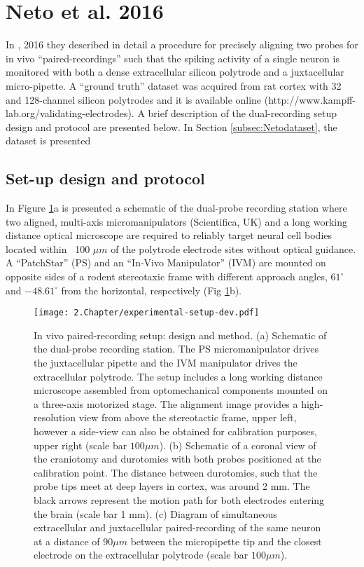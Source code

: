 
\section{Neto et al. 2016}
\label{sec:exp-setup}
In \cite{Netoetal}, 2016 they described in detail a procedure for precisely aligning two probes for in vivo “paired-recordings” such that the spiking activity of a single neuron is monitored with both a dense extracellular silicon polytrode and a juxtacellular micro-pipette. A “ground truth” dataset was acquired from rat cortex with 32 and 128-channel silicon polytrodes and it is available online (http://www.kampff-lab.org/validating-electrodes). A brief description of the dual-recording setup design and protocol are presented below. In Section \ref{subsec:Netodataset}, the dataset is presented

\subsection{Set-up design and protocol}
\label{subsec:setup-and-protocol}
In Figure \ref{fig:experimental-aparatus}a is presented a schematic of the dual-probe recording station where two aligned, multi-axis micromanipulators (Scientifica, UK) and a long working distance optical microscope are required to reliably target neural cell bodies located within ~100 $\mu m$ of the polytrode electrode sites without optical guidance. A “PatchStar” (PS) and an “In-Vivo Manipulator” (IVM) are mounted on opposite sides of a rodent stereotaxic frame with different approach angles, $61^{\circ}$  and $-48.61^{\circ}$  from the horizontal, respectively (Fig \ref{fig:experimental-aparatus}b). 

\begin{figure}[htb]
	\centering
	\texttt{[image: 2.Chapter/experimental-setup-dev.pdf]}
	\caption{In vivo paired-recording setup: design and method.
(a) Schematic of the dual-probe recording station. The PS micromanipulator drives the juxtacellular pipette and the IVM manipulator drives the extracellular polytrode. The setup includes a long working distance microscope assembled from optomechanical components mounted on a three-axis motorized stage. The alignment image provides a high-resolution view from above the stereotactic frame, upper left, however a side-view can also be obtained for calibration purposes, upper right (scale bar $100 \mu m$).  (b) Schematic of a coronal view of the craniotomy and durotomies with both probes positioned at the calibration point. The distance between durotomies, such that the probe tips meet at deep layers in cortex, was around 2 mm. The black arrows represent the motion path for both electrodes entering the brain (scale bar 1 mm). (c) Diagram of simultaneous extracellular and juxtacellular paired-recording of the same neuron at a distance of $90 \mu m$ between the micropipette tip and the closest electrode on the extracellular polytrode (scale bar $100 \mu m$).}
\label{fig:experimental-aparatus}
\end{figure}

